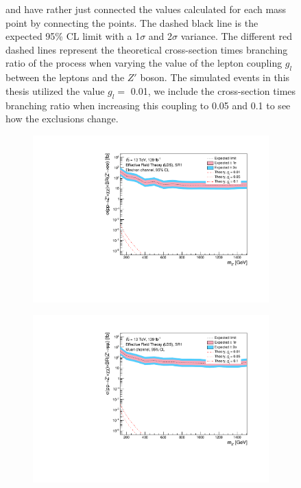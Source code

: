 \documentclass[12pt, a4paper]{book}
\begin{document}
\begin{figure}[!ht]
{   and have rather just connected the values calculated for each mass point by connecting the points. The dashed black line is the expected 95\% CL limit with a 1$\sigma$ and 2$\sigma$ variance. 
   The different red dashed lines represent the theoretical cross-section times branching ratio of the process when varying the value of the lepton coupling $g_l$ between the leptons and the $Z'$ boson. The simulated events in this thesis utilized the value $g_l=$ 0.01, we include the cross-section times branching ratio when increasing this coupling to 0.05 and 0.1 to see how the exclusions change.  }
\end{figure}

\begin{figure}[!ht]
	\centering
	\begin{subfigure}[b]{0.49\textwidth}
      \centering
      \includegraphics[width=1\textwidth]{Limits/Model_independent/50-100/EFT_LDS/mass_exclusion_ee.pdf}
   \end{subfigure}
   \hfill
   \begin{subfigure}[b]{0.49\textwidth}
      \centering
      \includegraphics[width=1\textwidth]{Limits/Model_independent/50-100/EFT_LDS/mass_exclusion_uu.pdf}

\end{subfigure}
\end{figure}
\end{document}
